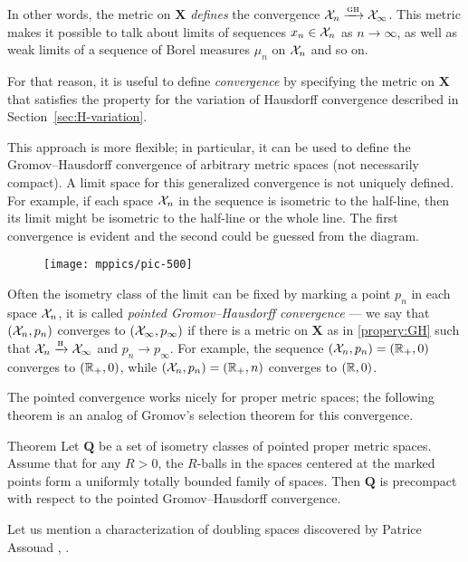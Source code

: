 In other words, the metric on $\bm{X}$ \textit{defines} the convergence $\spc{X}_n\z\GHto \spc{X}_\infty$.
This metric makes it possible to talk about limits of sequences $x_n\in \mathcal{X}_n$ as $n\to\infty$, as well as weak limits of a sequence of Borel measures $\mu_n$ on $\mathcal{X}_n$ and so on.

For that reason, it is useful to define \emph{convergence} by specifying the metric on $\bm{X}$ that satisfies the property
for the variation of Hausdorff convergence described in Section~\ref{sec:H-variation}.

This approach is more flexible;
in particular, it can be used to define the Gromov--Hausdorff convergence of arbitrary metric spaces (not necessarily compact).
A limit space for this generalized convergence is not uniquely defined.
For example, if each space $\mathcal{X}_n$ in the sequence is isometric to the half-line, then its limit might be isometric to the half-line or the whole line.
The first convergence is evident and the second could be guessed from the diagram.

\begin{figure}[ht!]
\vskip-0mm
\centering
\texttt{[image: mppics/pic-500]}
\end{figure}

Often the isometry class of the limit can be fixed by marking a point $p_n$ in each space $\mathcal{X}_n$, it is called \emph{pointed Gromov--Hausdorff convergence} --- we say that $(\mathcal{X}_n,p_n)$ converges to $(\mathcal{X}_\infty,p_\infty)$ if there is a metric on $\bm{X}$ as in \ref{propery:GH} such that $\mathcal{X}_n\xrightarrow{\mbox{\tiny\rm H}} \mathcal{X}_\infty$ and $p_n\to p_\infty$.
For example, the sequence $(\mathcal{X}_n,p_n)=(\mathbb{R}_+,0)$ converges to $(\mathbb{R}_+,0)$, while $(\mathcal{X}_n,p_n)=(\mathbb{R}_+,n)$ converges to $(\mathbb{R},0)$.

The pointed convergence works nicely for proper metric spaces;
the following theorem is an analog of Gromov's selection theorem for this convergence.

\begin{thm}{Theorem}\label{thm:pointed-gromov-compactness}%
Let $\bm{Q}$ be a set of isometry classes of pointed proper metric spaces.
Assume that for any $R>0$, the $R$-balls in the spaces centered at the marked points form a uniformly totally bounded family of spaces.
Then $\bm{Q}$ is precompact with respect to the pointed Gromov--Hausdorff convergence. 
\end{thm}

Let us mention a characterization of doubling spaces discovered by Patrice Assouad \cite{assouad}, \cite[12.2]{heinonen}.

